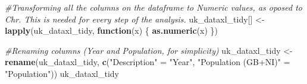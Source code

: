 \documentclass[]{article}
\newenvironment{Shaded}{\begin{snugshade}}{\end{snugshade}}
\newcommand{\KeywordTok}[1]{\textcolor[rgb]{0.13,0.29,0.53}{\textbf{#1}}}
\newcommand{\StringTok}[1]{\textcolor[rgb]{0.31,0.60,0.02}{#1}}
\newcommand{\CommentTok}[1]{\textcolor[rgb]{0.56,0.35,0.01}{\textit{#1}}}
\newcommand{\ControlFlowTok}[1]{\textcolor[rgb]{0.13,0.29,0.53}{\textbf{#1}}}
\newcommand{\NormalTok}[1]{#1}
\begin{document}
\begin{Shaded}
\begin{Highlighting}[]
\CommentTok{#Transforming all the columns on the dataframe to Numeric values, as oposed to Chr. This is needed for every step of the analysis.}
\NormalTok{uk_dataxl_tidy[] <-}\StringTok{ }\KeywordTok{lapply}\NormalTok{(uk_dataxl_tidy, }\ControlFlowTok{function}\NormalTok{(x) \{}
    \KeywordTok{as.numeric}\NormalTok{(x)}
\NormalTok{\})}

\CommentTok{#Renaming columns (Year and Population, for simplicity)}
\NormalTok{uk_dataxl_tidy <-}\StringTok{ }\KeywordTok{rename}\NormalTok{(uk_dataxl_tidy, }\KeywordTok{c}\NormalTok{(}\StringTok{"Description"}\NormalTok{ =}\StringTok{ "Year"}\NormalTok{, }\StringTok{"Population (GB+NI)"}\NormalTok{ =}\StringTok{ "Population"}\NormalTok{))}
\NormalTok{uk_dataxl_tidy}
\end{Highlighting}
\end{Shaded}
\end{document}
